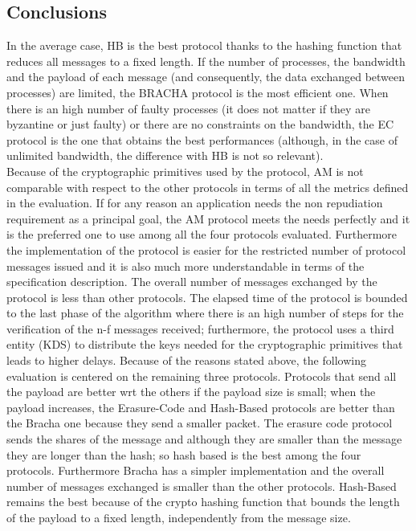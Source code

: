 \documentclass[12pt]{article}
\begin{document}
\subsection{Conclusions}
In the average case, HB is the best protocol thanks to the hashing function that reduces all messages to a fixed length. If the number of processes, the bandwidth and the payload of each message (and consequently, the data exchanged between processes) are limited, the BRACHA protocol is the most efficient one.
When there is an high number of faulty processes (it does not matter if they are byzantine or just faulty) or there are no constraints on the bandwidth, the EC protocol is the one that obtains the best performances (although, in the case of unlimited bandwidth, the difference with HB is not so relevant). \\
Because of the cryptographic primitives used by the protocol, AM is not comparable with respect to the other protocols in terms of all the metrics defined in the evaluation. 
If for any reason an application needs the non repudiation requirement as a principal goal, the AM protocol meets the needs perfectly and it is the preferred one to use among all the four protocols evaluated.
Furthermore the implementation of the protocol is easier for the restricted number of protocol messages issued and  it is also much more understandable in terms of the specification description. 
The overall number of messages exchanged by the protocol is less than other protocols.
The elapsed time of the protocol is bounded to the last phase of the algorithm where there is an high number of steps for the verification of the n-f messages received; furthermore, the protocol uses a third entity (KDS) to distribute the keys needed for the cryptographic primitives that leads to higher delays.
Because of the reasons stated above, the following evaluation is centered on the remaining three protocols.
Protocols that send all the payload are better wrt the others if the payload size is small; when the payload increases, the Erasure-Code and Hash-Based protocols are better than the Bracha one because they send a smaller packet. The erasure code protocol sends the shares of the message and although they are smaller than the message they are longer than the hash; so hash based is the best among the four protocols. Furthermore Bracha has a simpler implementation and the overall number of messages exchanged is smaller than the other protocols.
Hash-Based remains the best because of the crypto hashing function that bounds the length of the payload to a fixed length, independently from the message size.
\end{document}
